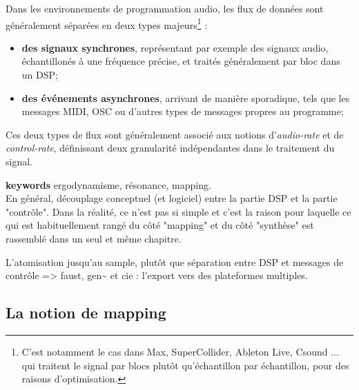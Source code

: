 Dans les environnements de programmation audio, les flux de données sont généralement séparées en deux types majeurs\footnote{C'est notamment le cas dans Max, SuperCollider, Ableton Live, Csound ... qui traitent le signal par blocs plutôt qu'échantillon par échantillon, pour des raisons d'optimisation.} : 
\vspace{-1em}
\begin{itemize}[noitemsep]
	\item \textbf{des signaux synchrones}, représentant par exemple des signaux audio, échantillonés à une fréquence précise, et traités généralement par bloc dans un \gls{DSP};
	\item \textbf{des événements asynchrones}, arrivant de manière sporadique, tels que les messages \gls{MIDI}, \gls{OSC} ou d'autres types de messages propres au programme;
\end{itemize}

\noindent Ces deux types de flux sont généralement associé aux notions d'\textit{audio-rate} et de \textit{control-rate}, définissant deux granularité indépendantes dans le traitement du signal.


\textbf{keywords} ergodynamisme, résonance, mapping.\\

En général, découplage conceptuel (et logiciel) entre la partie DSP et la partie "contrôle". Dans la réalité, ce n'est pas si simple et c'est la raison pour laquelle ce qui est habituellement rangé du côté "mapping" et du côté "synthèse" est rassemblé dans un seul et même chapitre.



L’atomisation jusqu’au sample, plutôt que séparation entre DSP et messages de contrôle
=> faust, gen\textasciitilde{ } et cie : l’export vers des plateformes multiples.

\subsection{La notion de mapping}

